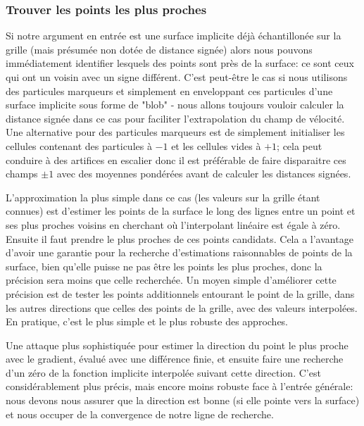 \documentclass[11pt]{report}
\begin{document}
\subsubsection*{Trouver les points les plus proches}

Si notre argument en entrée est une surface implicite déjà échantillonée sur la grille (mais présumée non dotée de distance signée) alors nous pouvons immédiatement identifier lesquels des points sont près de la surface: ce sont ceux qui ont un voisin avec un signe différent. C'est peut-être le cas si nous utilisons des particules marqueurs et simplement en enveloppant ces particules d'une surface implicite sous forme de "blob" - nous allons toujours vouloir calculer la distance signée dans ce cas pour faciliter l'extrapolation du champ de vélocité. Une alternative pour des particules marqueurs est de simplement initialiser les cellules contenant des particules à $-1$ et les cellules vides à $+1$; cela peut conduire à des artifices en escalier donc il est préférable de faire disparaitre ces champs $\pm 1$ avec des moyennes pondérées avant de calculer les distances signées.\newline

L'approximation la plus simple dans ce cas (les valeurs sur la grille étant connues) est d'estimer les points de la surface le long des lignes entre un point et ses plus proches voisins en cherchant où l'interpolant linéaire est égale à zéro. Ensuite il faut prendre le plus proches de ces points candidats. Cela a l'avantage d'avoir une garantie pour la recherche d'estimations raisonnables de points de la surface, bien qu'elle puisse ne pas être les points les plus proches, donc la précision sera moins que celle recherchée. Un moyen simple d'améliorer cette précision est de tester les points additionnels entourant le point de la grille, dans les autres directions que celles des points de la grille, avec des valeurs interpolées. En pratique, c'est le plus simple et le plus robuste des approches.\newline

Une attaque plus sophistiquée pour estimer la direction du point le plus proche avec le gradient, évalué avec une différence finie, et ensuite faire une recherche d'un zéro de la fonction implicite interpolée suivant cette direction. C'est considérablement plus précis, mais encore moins robuste face à l'entrée générale: nous devons nous assurer que la direction est bonne (si elle pointe vers la surface) et nous occuper de la convergence de notre ligne de recherche.\newline
\end{document}
